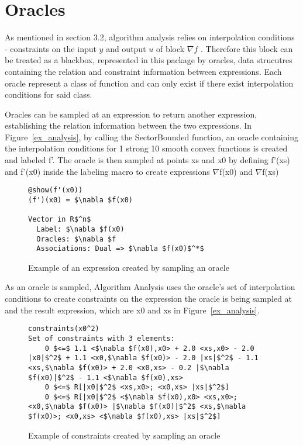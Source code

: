 \section{Oracles} \label{oracles}
As mentioned in section 3.2, algorithm analysis relies on interpolation conditions - constraints on the input $y$ and output $u$ of block \( \nabla f \) . Therefore this block can be treated as a blackbox,  represented in this package by oracles, data strucutres containing the relation and constraint information between expressions. Each oracle represent a class of function and can only exist if there exist interpolation conditions for said class.

Oracles can be sampled at an expression to return another expression, establishing the relation information between the two expressions.  In Figure~\ref{ex_analysis}, by calling the SectorBounded function, an oracle containing the interpolation conditions for 1 strong 10 smooth convex functions is created and labeled f'. The oracle is then sampled at points xs and x0 by defining f'(xs) and f'(x0) inside the labeling macro to create expressions $\nabla $f(x0) and $\nabla $f(xs)

\begin{figure}[!h]
	\begin{lstlisting}[mathescape]
@show(f'(x0))
(f')(x0) = $\nabla $f(x0)

Vector in R$^n$
  Label: $\nabla $f(x0)
  Oracles: $\nabla $f
  Associations: Dual => $\nabla $f(x0)$^*$

\end{lstlisting}
\caption{Example of an expression created by sampling an oracle}
\label{ex_sampling}
\end{figure}

As an oracle is sampled, Algorithm Analysis uses the oracle's set of interpolation conditions to create constraints on the expression the oracle is being sampled at and the result expression, which are x0 and xs in Figure~\ref{ex_analysis}.

\begin{figure}[!h]
	\begin{lstlisting}[mathescape]
constraints(x0^2)
Set of constraints with 3 elements:
	0 $<=$ 1.1 <$\nabla $f(x0),x0> + 2.0 <xs,x0> - 2.0 |x0|$^2$ + 1.1 <x0,$\nabla $f(x0)> - 2.0 |xs|$^2$ - 1.1 <xs,$\nabla $f(x0)> + 2.0 <x0,xs> - 0.2 |$\nabla $f(x0)|$^2$ - 1.1 <$\nabla $f(x0),xs>
	0 $<=$ R[|x0|$^2$ <xs,x0>; <x0,xs> |xs|$^2$]
	0 $<=$ R[|x0|$^2$ <$\nabla $f(x0),x0> <xs,x0>; <x0,$\nabla $f(x0)> |$\nabla $f(x0)|$^2$ <xs,$\nabla $f(x0)>; <x0,xs> <$\nabla $f(x0),xs> |xs|$^2$]
	\end{lstlisting}
	\caption{Example of constraints created by sampling an oracle}
	\label{ex_orc_constraints}
\end{figure}

